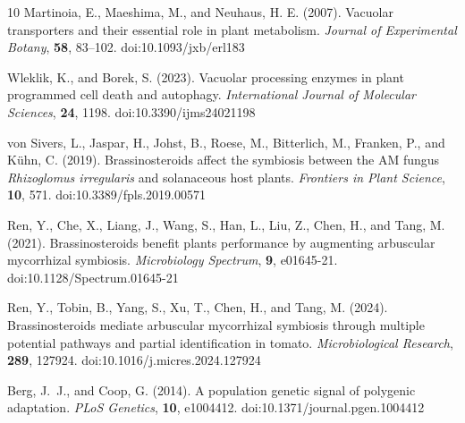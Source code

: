 \documentclass[unnumsec,webpdf,contemporary,large]{oup-authoring-template}%
\theoremstyle{thmstyleone}%
\theoremstyle{thmstyletwo}%
\theoremstyle{thmstylethree}%
\begin{document}
\begin{thebibliography}{10}
Martinoia, E., Maeshima, M., and Neuhaus, H. E. (2007).
Vacuolar transporters and their essential role in plant metabolism.
\textit{Journal of Experimental Botany}, \textbf{58}, 83--102.
doi:10.1093/jxb/erl183

Wleklik, K., and Borek, S. (2023).
Vacuolar processing enzymes in plant programmed cell death and autophagy.
\textit{International Journal of Molecular Sciences}, \textbf{24}, 1198.
doi:10.3390/ijms24021198

von Sivers, L., Jaspar, H., Johst, B., Roese, M., Bitterlich, M., Franken, P., and K{\"u}hn, C. (2019).
Brassinosteroids affect the symbiosis between the AM fungus \textit{Rhizoglomus irregularis} and solanaceous host plants.
\textit{Frontiers in Plant Science}, \textbf{10}, 571.
doi:10.3389/fpls.2019.00571

Ren, Y., Che, X., Liang, J., Wang, S., Han, L., Liu, Z., Chen, H., and Tang, M. (2021).
Brassinosteroids benefit plants performance by augmenting arbuscular mycorrhizal symbiosis.
\textit{Microbiology Spectrum}, \textbf{9}, e01645-21.
doi:10.1128/Spectrum.01645-21

Ren, Y., Tobin, B., Yang, S., Xu, T., Chen, H., and Tang, M. (2024).
Brassinosteroids mediate arbuscular mycorrhizal symbiosis through multiple potential pathways and partial identification in tomato.
\textit{Microbiological Research}, \textbf{289}, 127924.
doi:10.1016/j.micres.2024.127924

Berg, J.~J., and Coop, G. (2014).
A population genetic signal of polygenic adaptation.
\textit{PLoS Genetics}, \textbf{10}, e1004412.
doi:10.1371/journal.pgen.1004412

\end{thebibliography}


\end{document}
